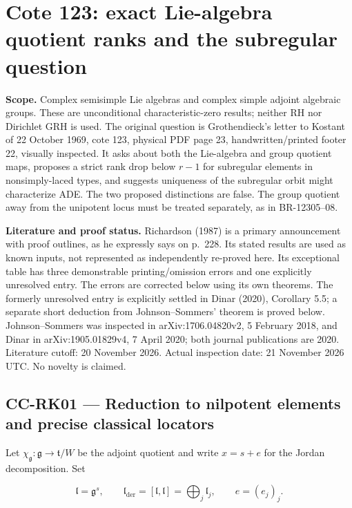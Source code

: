 \section{Cote 123: exact Lie-algebra quotient ranks and the subregular question}\label{cote-123-exact-lie-algebra-quotient-ranks-and-the-subregular-question}

\textbf{Scope.} Complex semisimple Lie algebras and complex simple adjoint algebraic groups. These are unconditional characteristic-zero results; neither RH nor Dirichlet GRH is used. The original question is Grothendieck's letter to Kostant of 22 October 1969, cote 123, physical PDF page 23, handwritten/printed footer 22, visually inspected. It asks about both the Lie-algebra and group quotient maps, proposes a strict rank drop below \(r-1\) for subregular elements in nonsimply-laced types, and suggests uniqueness of the subregular orbit might characterize ADE. The two proposed distinctions are false. The group quotient away from the unipotent locus must be treated separately, as in BR-12305--08.

\textbf{Literature and proof status.} Richardson (1987) is a primary announcement with proof outlines, as he expressly says on p.~228. Its stated results are used as known inputs, not represented as independently re-proved here. Its exceptional table has three demonstrable printing/omission errors and one explicitly unresolved entry. The errors are corrected below using its own theorems. The formerly unresolved entry is explicitly settled in Dinar (2020), Corollary 5.5; a separate short deduction from Johnson--Sommers' theorem is proved below. Johnson--Sommers was inspected in arXiv:1706.04820v2, 5 February 2018, and Dinar in arXiv:1905.01829v4, 7 April 2020; both journal publications are 2020. Literature cutoff: 20 November 2026. Actual inspection date: 21 November 2026 UTC. No novelty is claimed.

\subsection{CC-RK01 --- Reduction to nilpotent elements and precise classical locators}\label{cc-rk01-reduction-to-nilpotent-elements-and-precise-classical-locators}

Let \(\chi_{\mathfrak g}:\mathfrak g\to\mathfrak t/W\) be the adjoint quotient and write \(x=s+e\) for the Jordan decomposition. Set

\[
 \mathfrak l=\mathfrak g^s,
 \qquad \mathfrak l_{\mathrm{der}}=[\mathfrak l,\mathfrak l]
       =\bigoplus_j\mathfrak l_j,
 \qquad e=(e_j)_j.
\]

